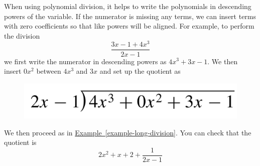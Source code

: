 \documentclass[10pt,]{book}
\theoremstyle{plain}
\theoremstyle{definition}
\theoremstyle{definition}
\theoremstyle{definition}
\numberwithin{equation}{part}
\begin{document}
\par
When using polynomial division, it helps to write the polynomials in descending powers of the variable. If the numerator is missing any terms, we can insert terms with zero coefficients so that like powers will be aligned. For example, to perform the division%
\begin{equation*}
\frac{3x − 1 + 4x^3}{2x-1}
\end{equation*}
we first write the numerator in descending powers as \(4x^3 + 3x − 1\). We then insert \(0x^2\) between \(4x^3\) and \(3x\) and set up the quotient as \leavevmode%
\begin{figure}
\centering
\includegraphics[width=0.38\linewidth]{images/fig-long-division4.jpg}
\end{figure}
 We then proceed as in \hyperref[example-long-division]{Example~\ref{example-long-division}}. You can check that the quotient is%
\begin{equation*}
2x^2 + x + 2 + \frac{1}{2x-1}
\end{equation*}
%
\typeout{************************************************}
\typeout{************************************************}
\end{document}
